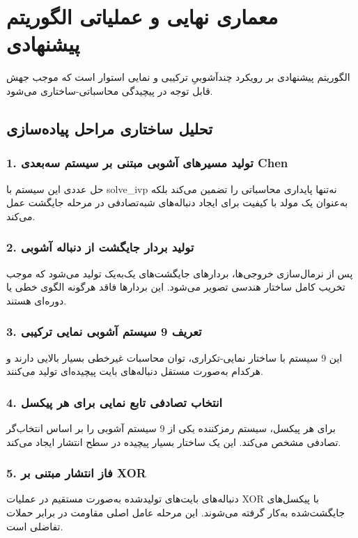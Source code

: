 \documentclass[a4paper,12pt]{report}
\renewcommand{\%}{\lr{\oldpercent}}
\providecommand{\lr}[1]{#1}
\begin{document}
\section{معماری نهایی و عملیاتی الگوریتم پیشنهادی}
الگوریتم پیشنهادی بر رویکرد چندآشوبیِ ترکیبی و نمایی استوار است که موجب جهش قابل توجه در پیچیدگی محاسباتی-ساختاری می‌شود.

\subsection{تحلیل ساختاری مراحل پیاده‌سازی}

\subsubsection{1. تولید مسیرهای آشوبی مبتنی بر سیستم سه‌بعدی \lr{Chen}}
حل عددی این سیستم با \lr{solve\_ivp} نه‌تنها پایداری محاسباتی را تضمین می‌کند بلکه به‌عنوان یک مولد با کیفیت برای ایجاد دنباله‌های شبه‌تصادفی در مرحله جایگشت عمل می‌کند.

\subsubsection{2. تولید بردار جایگشت از دنباله آشوبی}
پس از نرمال‌سازی خروجی‌ها، بردارهای جایگشت‌های یک‌به‌یک تولید می‌شود که موجب تخریب کامل ساختار هندسی تصویر می‌شود. این بردارها فاقد هرگونه الگوی خطی یا دوره‌ای هستند.

\subsubsection{3. تعریف 9 سیستم آشوبی نمایی ترکیبی}
این 9 سیستم با ساختار نمایی-تکراری، توان محاسبات غیرخطی بسیار بالایی دارند و هرکدام به‌صورت مستقل دنباله‌های بایت پیچیده‌ای تولید می‌کنند.

\subsubsection{4. انتخاب تصادفی تابع نمایی برای هر پیکسل}
برای هر پیکسل، سیستم رمزکننده یکی از 9 سیستم آشوبی را بر اساس انتخاب‌گر تصادفی مشخص می‌کند. این یک ساختار بسیار پیچیده در سطح انتشار ایجاد می‌کند.

\subsubsection{5. فاز انتشار مبتنی بر \lr{XOR}}
دنباله‌های بایت‌های تولیدشده به‌صورت مستقیم در عملیات \lr{XOR} با پیکسل‌های جایگشت‌شده به‌کار گرفته می‌شوند. این مرحله عامل اصلی مقاومت در برابر حملات تفاضلی است.
\end{document}

